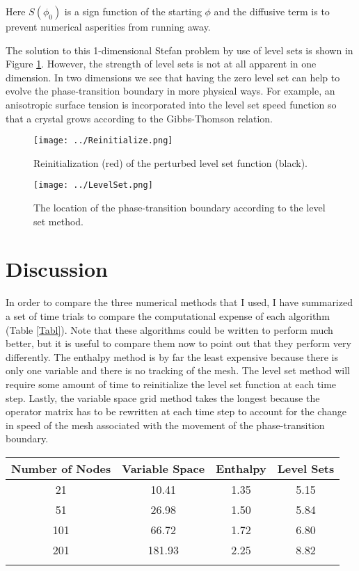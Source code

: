 \documentclass[12pt]{article}
\begin{document}
Here $S(\phi_0)$ is a sign function of the starting $\phi$ and the diffusive term is to prevent numerical asperities from running away.

The solution to this 1-dimensional Stefan problem by use of level sets is shown in Figure \ref{LevSet}. However, the strength of level sets is not at all apparent in one dimension. In two dimensions \citep{Chen1997} we see that having the zero level set can help to evolve the phase-transition boundary in more physical ways. For example, an anisotropic surface tension is incorporated into the level set speed function so that a crystal grows according to the Gibbs-Thomson relation.

\begin{figure}[]
\centering
{}
  \texttt{[image: ../Reinitialize.png]}
  \caption{Reinitialization (red) of the perturbed level set function (black).}
  \label{Reinit}
\endminipage
\hfill
{}
  \texttt{[image: ../LevelSet.png]}
  \caption{The location of the phase-transition boundary according to the level set method.}
  \label{LevSet}
\endminipage
\end{figure}


\section{Discussion}

In order to compare the three numerical methods that I used, I have summarized a set of time trials to compare the computational expense of each algorithm (Table \ref{Tabl}). Note that these algorithms could be written to perform much better, but it is useful to compare them now to point out that they perform very differently. The enthalpy method is by far the least expensive because there is only one variable and there is no tracking of the mesh. The level set method will require some amount of time to reinitialize the level set function at each time step. Lastly, the variable space grid method takes the longest because the operator matrix has to be rewritten at each time step to account for the change in speed of the mesh associated with the movement of the phase-transition boundary. 

\begin{center}
\vspace{1em}
\begin{tabular}{c c c c}
Number of Nodes &	Variable Space	& Enthalpy & Level Sets \\
\hline
21	&10.41	&1.35	&5.15\\
51	&26.98		&1.50	&5.84\\
101	&66.72		&1.72	&6.80\\
201	&181.93		&2.25	&8.82\\
\label{Tabl}
\end{tabular}
\end{center}
\end{document}
